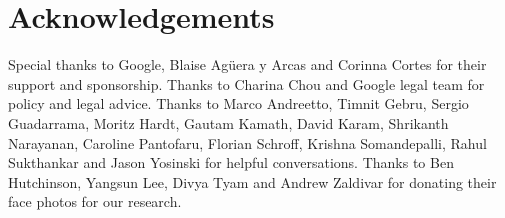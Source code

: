 \documentclass{article}
\begin{document}
\section{Acknowledgements}\label{sec:ack}

Special thanks to Google, Blaise Ag{\"u}era y Arcas and Corinna Cortes for their support and sponsorship.  Thanks to Charina Chou and Google legal team for policy and legal advice. Thanks to Marco Andreetto, Timnit Gebru, Sergio Guadarrama, Moritz Hardt, Gautam Kamath, David Karam, Shrikanth Narayanan, Caroline Pantofaru, Florian Schroff, Krishna Somandepalli, Rahul Sukthankar and Jason Yosinski for helpful conversations. Thanks to Ben Hutchinson, Yangsun Lee, Divya Tyam and Andrew Zaldivar for donating their face photos for our research.\vspace{-.5em}

%


\end{document}
